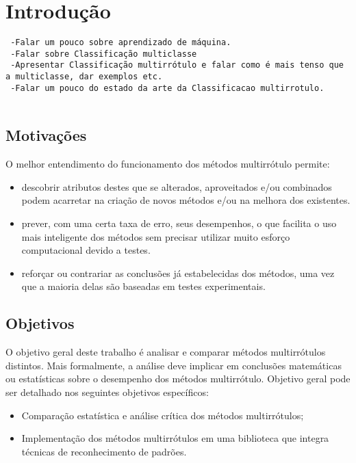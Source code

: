 
\newcommand{\NbasesV}{\textit{N}}
\newcommand{\Nbases}{123}
\newcommand{\Nml}{6}
\newcommand{\NmlT}{4}
\newcommand{\NmlA}{2}
\newcommand{\Ncb}{4}
\newcommand{\MML}{método multirrótulo}
\newcommand{\MMLs}{métodos multirrótulo}
\newcommand{\MRLM}{Método Revolucionário de Lucas Mello}
\newcommand{\MRLMa}{MRLM}

\chapter{Introdução}
\begin{verbatim}
 -Falar um pouco sobre aprendizado de máquina.
 -Falar sobre Classificação multiclasse
 -Apresentar Classificação multirrótulo e falar como é mais tenso que a multiclasse, dar exemplos etc.
 -Falar um pouco do estado da arte da Classificacao multirrotulo.
 
\end{verbatim}



\section{Motivações}
O melhor entendimento do funcionamento dos métodos multirrótulo permite:
\begin{itemize}
 \item descobrir atributos destes que se alterados, aproveitados
 e/ou combinados podem acarretar na criação de novos métodos e/ou na melhora dos existentes.
 \item prever, com uma certa taxa de erro, seus desempenhos, o que facilita o uso mais inteligente dos métodos
 sem precisar utilizar muito esforço computacional devido a testes.
 \item reforçar ou contrariar as conclusões já estabelecidas dos métodos, uma vez que a maioria delas são 
 baseadas em testes experimentais.
\end{itemize}

\section{Objetivos}
O objetivo geral deste trabalho é analisar e comparar métodos multirrótulos distintos.
Mais formalmente, a análise deve implicar em conclusões matemáticas ou estatísticas sobre o desempenho dos métodos multirrótulo.
Objetivo geral pode ser detalhado nos seguintes objetivos específicos:
\begin{itemize}
 \item Comparação estatística e análise crítica dos métodos multirrótulos;
 \item Implementação dos métodos multirrótulos em uma biblioteca que integra técnicas de reconhecimento de padrões.
\end{itemize}


